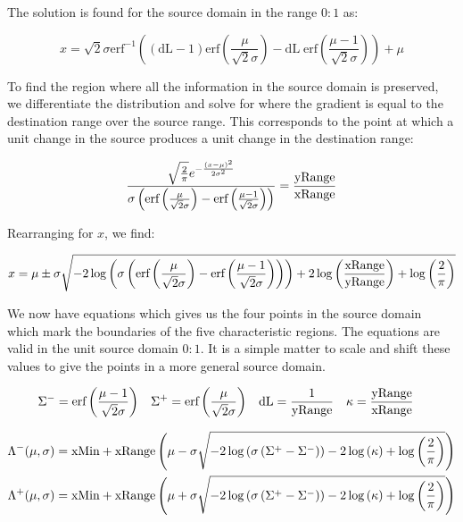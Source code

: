 The solution is found for the source domain in the range $0:1$ as:


\begin{equation}\label{eq:LowHigh}
 x = \sqrt{2} \sigma  \text{erf}^{-1}\left((\text{dL}-1) \text{erf}\left(\frac{\mu }{\sqrt{2} \sigma }\right)-\text{dL} \; \text{erf}\left(\frac{\mu -1}{\sqrt{2} \sigma }\right)\right)+\mu
\end{equation}

To find the region where all the information in the source domain is preserved, we differentiate the distribution and solve for where the gradient is equal to the destination range over the source range. This corresponds to the point at which a unit change in the source produces a unit change in the destination range:

\begin{equation}\label{eq:Boundaries}
\frac{\sqrt{\frac{2}{\pi }} e^{-\frac{(x-\mu )^2}{2 \sigma ^2}}}{\sigma  \left(\text{erf}\left(\frac{\mu }{\sqrt{2} \sigma }\right)-\text{erf}\left(\frac{\mu -1}{\sqrt{2} \sigma }\right)\right)}=\frac{\text{yRange}}{\text{xRange}}
\end{equation}

Rearranging for $x$, we find:

\begin{equation}\label{eq:PreservedRegion}
 x=\mu \pm \sigma  \sqrt{-2 \log \left(\sigma  \left(\text{erf}\left(\frac{\mu }{\sqrt{2} \sigma }\right)-\text{erf}\left(\frac{\mu -1}{\sqrt{2} \sigma }\right)\right)\right)+2 \log \left(\frac{\text{xRange}}{\text{yRange}}\right)+\log \left(\frac{2}{\pi }\right)}
\end{equation}

We now have equations which gives us the four points in the source domain which mark the boundaries of the five characteristic regions. The equations are valid in the unit source domain $0:1$. It is a simple matter to scale and shift these values to give the points in a more general source domain.


\begin{equation}
\begin{aligned}
\Sigma^- &= \text{erf}\left(\frac{\mu -1}{\sqrt{2} \sigma }\right) &
 \Sigma^+ &= \text{erf}\left(\frac{\mu }{\sqrt{2} \sigma }\right) &
  \text{dL} &= \frac{1}{\text{yRange}} &
  \kappa &= \frac{\text{yRange}}{\text{xRange}} 
\end{aligned}
\end{equation}

\begin{equation}\label{eq:PreservedRegionGen}
\begin{aligned}
\Lambda^-(\mu,\sigma) &= \text{xMin} + \text{xRange}\left( \mu - \sigma  \sqrt{-2 \log \left(\sigma  \left(\Sigma^+-\Sigma^-\right)\right) - 2 \log \left(\kappa\right)+\log \left(\frac{2}{\pi }\right)}\right) \\
\Lambda^+(\mu,\sigma) &= \text{xMin} + \text{xRange} \left(\mu + \sigma  \sqrt{-2 \log \left(\sigma  \left(\Sigma^+-\Sigma^-\right)\right)-2 \log \left(\kappa\right)+\log \left(\frac{2}{\pi }\right)}\right)
\end{aligned}
\end{equation}

